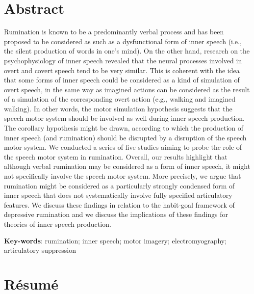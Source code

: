 \documentclass[a4paper,12pt,twoside,onecolumn,openright,final,oldfontcommands]{memoir}
\newcommand{\initial}[1]{
	\lettrine[lines=3,lhang=0.33,nindent=0em]{
		\color{gray}
     		{\textsc{#1}}}{}}
\newcommand\blankpage{%
    \null
    \thispagestyle{empty}%
    \newpage
    }
\begin{document}
\MakeUGthesePDG %
\blankpage %
\OnehalfSpacing %
\setmainfont{Heuristica} %

\chapter*{Abstract}

\initial{R}umination is known to be a predominantly verbal process and has been proposed to be considered as such as a dysfunctional form of inner speech (i.e., the silent production of words in one's mind). On the other hand, research on the psychophysiology of inner speech revealed that the neural processes involved in overt and covert speech tend to be very similar. This is coherent with the idea that some forms of inner speech could be considered as a kind of simulation of overt speech, in the same way as imagined actions can be considered as the result of a simulation of the corresponding overt action (e.g., walking and imagined walking). In other words, the motor simulation hypothesis suggests that the speech motor system should be involved as well during inner speech production. The corollary hypothesis might be drawn, according to which the production of inner speech (and rumination) should be disrupted by a disruption of the speech motor system. We conducted a series of five studies aiming to probe the role of the speech motor system in rumination. Overall, our results highlight that although verbal rumination may be considered as a form of inner speech, it might not specifically involve the speech motor system. More precisely, we argue that rumination might be considered as a particularly strongly condensed form of inner speech that does not systematically involve fully specified articulatory features. We discuss these findings in relation to the habit-goal framework of depressive rumination and we discuss the implications of these findings for theories of inner speech production.

\vspace{\baselineskip}

\textbf{Key-words}: rumination; inner speech; motor imagery; electromyography; articulatory suppression

\afterpage{\blankpage}

\chapter*{Résumé}
\end{document}
